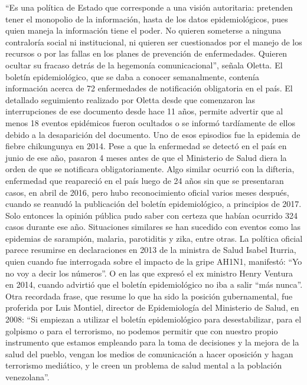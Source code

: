 \documentclass{article}%
\begin{document}
\newline%
%
“Es una política de Estado que corresponde a una visión autoritaria: pretenden tener el monopolio de la información, hasta de los datos epidemiológicos, pues quien maneja la información tiene el poder. No quieren someterse a ninguna contraloría social ni institucional, ni quieren ser cuestionados por el manejo de los recursos o por las fallas en los planes de prevención de enfermedades. Quieren ocultar su fracaso detrás de la hegemonía comunicacional”, señala Oletta.%
\newline%
%
El boletín epidemiológico, que se daba a conocer semanalmente, contenía información acerca de 72 enfermedades de notificación obligatoria en el país. El detallado seguimiento realizado por Oletta desde que comenzaron las interrupciones de ese documento desde hace 11 años, permite advertir que al menos 18 eventos epidémicos fueron ocultados o se informó tardíamente de ellos debido a la desaparición del documento. Uno de esos episodios fue la epidemia de fiebre chikungunya en 2014. Pese a que la enfermedad se detectó en el país en junio de ese año, pasaron 4 meses antes de que el Ministerio de Salud diera la orden de que se notificara obligatoriamente. Algo similar ocurrió con la difteria, enfermedad que reapareció en el país luego de 24 años sin que se presentaran casos, en abril de 2016, pero hubo reconocimiento oficial varios meses después, cuando se reanudó la publicación del boletín epidemiológico, a principios de 2017. Solo entonces la opinión pública pudo saber con certeza que habían ocurrido 324 casos durante ese año.%
\newline%
%
Situaciones similares se han sucedido con eventos como las epidemias de sarampión, malaria, parotiditis y zika, entre otras. La política oficial parece resumirse en declaraciones en 2013 de la ministra de Salud Isabel Iturria, quien cuando fue interrogada sobre el impacto de la gripe AH1N1, manifestó: “Yo no voy a decir los números”. O en las que expresó el ex ministro Henry Ventura en 2014, cuando advirtió que el boletín epidemiológico no iba a salir “más nunca”.%
\newline%
%
Otra recordada frase, que resume lo que ha sido la posición gubernamental, fue proferida por Luis Montiel, director de Epidemiología del Ministerio de Salud, en 2008: “Si empiezan a utilizar el boletín epidemiológico para desestabilizar, para el golpismo o para el terrorismo, no podemos permitir que con nuestro propio instrumento que estamos empleando para la toma de decisiones y la mejora de la salud del pueblo, vengan los medios de comunicación a hacer oposición y hagan terrorismo mediático, y le creen un problema de salud mental a la población venezolana”.%
\end{document}
